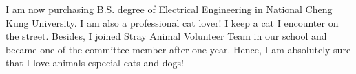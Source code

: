 

\begin{cvparagraph}

    I am now purchasing B.S. degree of Electrical Engineering in National Cheng Kung University. I am also a professional cat lover! I keep a cat I encounter on the street. Besides, I joined Stray Animal Volunteer Team in our school and became one of the committee member after one year. Hence, I am absolutely sure that I love animals especial cats and dogs!
\end{cvparagraph}
